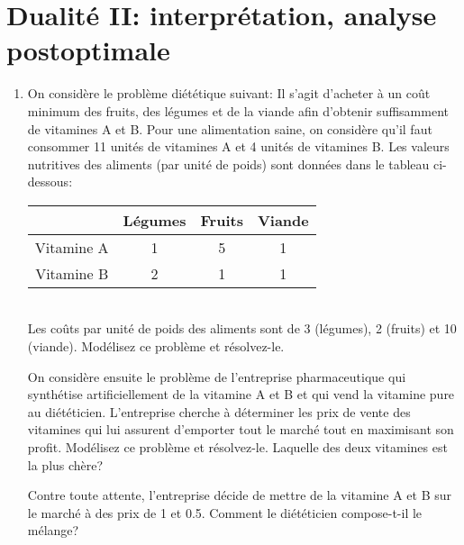 \section{Dualit\'e II: interprétation, analyse postoptimale}

\begin{enumerate}

  \item On considère le problème diététique suivant:
    Il s'agit d'acheter à un coût minimum des fruits, des légumes et
    de la viande afin d'obtenir suffisamment de vitamines A et B.
    Pour une alimentation saine, on considère qu'il faut consommer
    11 unités de vitamines A et 4 unités de vitamines B. Les valeurs
    nutritives des aliments (par unité de poids) sont données dans
    le tableau ci-dessous: \\

    \begin{tabular}{|c|c|c|c|}
      \hline
      & Légumes & Fruits & Viande \\
      \hline
      Vitamine A & 1 & 5 & 1 \\
      \hline
      Vitamine B & 2 & 1 & 1 \\
      \hline
    \end{tabular}\\

    Les coûts par unité de poids des aliments sont de 3 (légumes),
    2 (fruits) et 10 (viande). Modélisez ce problème et résolvez-le.

    On considère ensuite le problème de l'entreprise pharmaceutique qui synthétise
    artificiellement de la vitamine A et B et qui vend la vitamine pure au diététicien.  L'entreprise cherche à déterminer les prix
    de vente des vitamines qui lui assurent d'emporter tout le marché tout en maximisant son profit. Modélisez ce problème
    et résolvez-le. Laquelle des deux vitamines est la plus chère?

    Contre toute attente, l'entreprise décide de mettre de la vitamine A et B sur le marché à des prix de 1 et 0.5. Comment le
    diététicien compose-t-il le mélange?


\end{enumerate}
